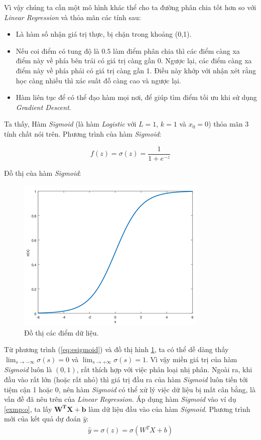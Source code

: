 Vì vậy chúng ta cần một mô hình khác thể cho ta đường phân chia tốt hơn so với \textit{Linear Regression} và thỏa mãn các tính sau:

\begin{itemize}
    \itemsep0em
    \item Là hàm số nhận giá trị thực, bị chặn trong khoảng (0,1).
    \item Nếu coi điểm có tung độ là $0.5$ làm điểm phân chia thì các điểm càng xa điểm này về phía bên trái có giá trị càng gần $0$. Ngược lại, các điểm càng xa điểm này về phía phải có giá trị càng gần 1. Điều này khớp với nhận xét rằng học càng nhiều thì xác suất đỗ càng cao và ngược lại.
    \item Hàm liên tục để có thể đạo hàm mọi nơi, để giúp tìm điểm tối ưu khi sử dụng \textit{Gradient Descent}.
\end{itemize}

Ta thấy, Hàm \textit{Sigmoid} (là hàm \textit{Logistic} với $L = 1$, $k = 1$ và $x_{0} = 0$) thỏa mãn 3 tính chất nói trên. Phương trình của hàm \textit{Sigmoid}:

\begin{equation}
    f(z)= \sigma(z) = \frac{1}{1 + e^{-z}}
    \label{eq:esigmoid}
\end{equation}

Đồ thị của hàm \textit{Sigmoid}:
\begin{figure}[!ht]
    \centering
    \includegraphics[scale=0.8]{books/artificial-neural-network/chapter02/figure/sigmoid.png}
    \caption{Đồ thị các điểm dữ liệu.}
    \label{fig:sigmoid}
\end{figure}

Từ phương trình (\ref{eq:esigmoid}) và đồ thị hình \ref{fig:sigmoid}, ta có thể dễ dàng thấy \newline $\lim_{s \rightarrow -\infty}\sigma(s) = 0$ và $\lim_{s \rightarrow +\infty}\sigma(s) = 1$. Vì vậy miền giá trị của hàm \textit{Sigmoid} luôn là $(0, 1)$, rất thích hợp với việc phân loại nhị phân. Ngoài ra, khi đầu vào  rất lớn (hoặc rất nhỏ) thì giá trị đầu ra của hàm \textit{Sigmoid} luôn tiến tới tiệm cận 1 hoặc 0, nên hàm \textit{Sigmoid} có thể xử lý việc dữ liệu bị mất cân bằng, là vấn đề đã nêu trên của \textit{Linear Regression}. Áp dụng hàm \textit{Sigmoid} vào ví dụ \ref{exmp:o}, ta lấy $\mathbf{W^TX + b}$ làm dữ liệu đầu vào của hàm \textit{Sigmoid}. Phương trình mới của kết quả dự đoán $\hat{y}$:
\begin{align*}
    \hat{y}= \sigma(z) = \sigma(W^TX + b)
\end{align*}

